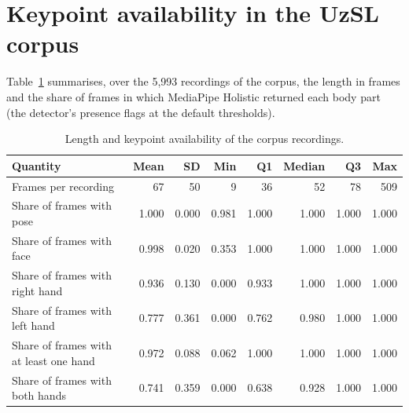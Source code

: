 \documentclass[a4paper,10pt]{article}
\begin{document}
\section{Keypoint availability in the UzSL corpus}
Table~\ref{tab:s_qc} summarises, over the 5,993 recordings of the corpus, the length in frames and the share of frames in which MediaPipe Holistic returned each body part (the detector's presence flags at the default thresholds).
\begin{table}[H]
\caption{Length and keypoint availability of the corpus recordings.}\label{tab:s_qc}
\centering
\footnotesize
\begin{tabular}{lrrrrrrr}
\toprule
\textbf{Quantity} & \textbf{Mean} & \textbf{SD} & \textbf{Min} & \textbf{Q1} & \textbf{Median} & \textbf{Q3} & \textbf{Max} \\
\midrule
Frames per recording & 67 & 50 & 9 & 36 & 52 & 78 & 509 \\
Share of frames with pose & 1.000 & 0.000 & 0.981 & 1.000 & 1.000 & 1.000 & 1.000 \\
Share of frames with face & 0.998 & 0.020 & 0.353 & 1.000 & 1.000 & 1.000 & 1.000 \\
Share of frames with right hand & 0.936 & 0.130 & 0.000 & 0.933 & 1.000 & 1.000 & 1.000 \\
Share of frames with left hand & 0.777 & 0.361 & 0.000 & 0.762 & 0.980 & 1.000 & 1.000 \\
Share of frames with at least one hand & 0.972 & 0.088 & 0.062 & 1.000 & 1.000 & 1.000 & 1.000 \\
Share of frames with both hands & 0.741 & 0.359 & 0.000 & 0.638 & 0.928 & 1.000 & 1.000 \\
\bottomrule
\end{tabular}
\end{table}
\end{document}
